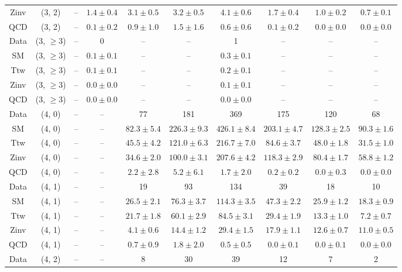 \begin{table}[h!]
{\begin{tabular}{cccccccccc}
	Zinv & (3, 2) & -- & $1.4\pm 0.4$ & $3.1\pm 0.5$ & $3.2\pm 0.5$ & $4.1\pm 0.6$ & $1.7\pm 0.4$ & $1.0\pm 0.2$ & $0.7\pm 0.1$ \\[0.5ex] 
	QCD & (3, 2) & -- & $0.1\pm 0.2$ & $0.9\pm 1.0$ & $1.5\pm 1.6$ & $0.6\pm 0.6$ & $0.1\pm 0.2$ & $0.0\pm 0.0$ & $0.0\pm 0.0$ \\[0.5ex] 
	Data & (3, $\ge3$) & -- & 0 & -- & -- & 1 & -- & -- & -- \\[0.5ex] 
	SM & (3, $\ge3$) & -- & $0.1\pm 0.1$ & -- & -- & $0.3\pm 0.1$ & -- & -- & -- \\[0.5ex] 
	Ttw & (3, $\ge3$) & -- & $0.1\pm 0.1$ & -- & -- & $0.2\pm 0.1$ & -- & -- & -- \\[0.5ex] 
	Zinv & (3, $\ge3$) & -- & $0.0\pm 0.0$ & -- & -- & $0.1\pm 0.1$ & -- & -- & -- \\[0.5ex] 
	QCD & (3, $\ge3$) & -- & $0.0\pm 0.0$ & -- & -- & $0.0\pm 0.0$ & -- & -- & -- \\[0.5ex] 
	Data & (4, 0) & -- & -- & 77 & 181 & 369 & 175 & 120 & 68 \\[0.5ex] 
	SM & (4, 0) & -- & -- & $82.3\pm 5.4$ & $226.3\pm 9.3$ & $426.1\pm 8.4$ & $203.1\pm 4.7$ & $128.3\pm 2.5$ & $90.3\pm 1.6$ \\[0.5ex] 
	Ttw & (4, 0) & -- & -- & $45.5\pm 4.2$ & $121.0\pm 6.3$ & $216.7\pm 7.0$ & $84.6\pm 3.7$ & $48.0\pm 1.8$ & $31.5\pm 1.0$ \\[0.5ex] 
	Zinv & (4, 0) & -- & -- & $34.6\pm 2.0$ & $100.0\pm 3.1$ & $207.6\pm 4.2$ & $118.3\pm 2.9$ & $80.4\pm 1.7$ & $58.8\pm 1.2$ \\[0.5ex] 
	QCD & (4, 0) & -- & -- & $2.2\pm 2.8$ & $5.2\pm 6.1$ & $1.7\pm 2.0$ & $0.2\pm 0.2$ & $0.0\pm 0.3$ & $0.0\pm 0.0$ \\[0.5ex] 
	Data & (4, 1) & -- & -- & 19 & 93 & 134 & 39 & 18 & 10 \\[0.5ex] 
	SM & (4, 1) & -- & -- & $26.5\pm 2.1$ & $76.3\pm 3.7$ & $114.3\pm 3.5$ & $47.3\pm 2.2$ & $25.9\pm 1.2$ & $18.3\pm 0.9$ \\[0.5ex] 
	Ttw & (4, 1) & -- & -- & $21.7\pm 1.8$ & $60.1\pm 2.9$ & $84.5\pm 3.1$ & $29.4\pm 1.9$ & $13.3\pm 1.0$ & $7.2\pm 0.7$ \\[0.5ex] 
	Zinv & (4, 1) & -- & -- & $4.1\pm 0.6$ & $14.4\pm 1.2$ & $29.4\pm 1.5$ & $17.9\pm 1.1$ & $12.6\pm 0.7$ & $11.0\pm 0.5$ \\[0.5ex] 
	QCD & (4, 1) & -- & -- & $0.7\pm 0.9$ & $1.8\pm 2.0$ & $0.5\pm 0.5$ & $0.0\pm 0.1$ & $0.0\pm 0.1$ & $0.0\pm 0.0$ \\[0.5ex] 
	Data & (4, 2) & -- & -- & 8 & 30 & 39 & 12 & 7 & 2 \\[0.5ex] 

\end{tabular}}
\end{table}
